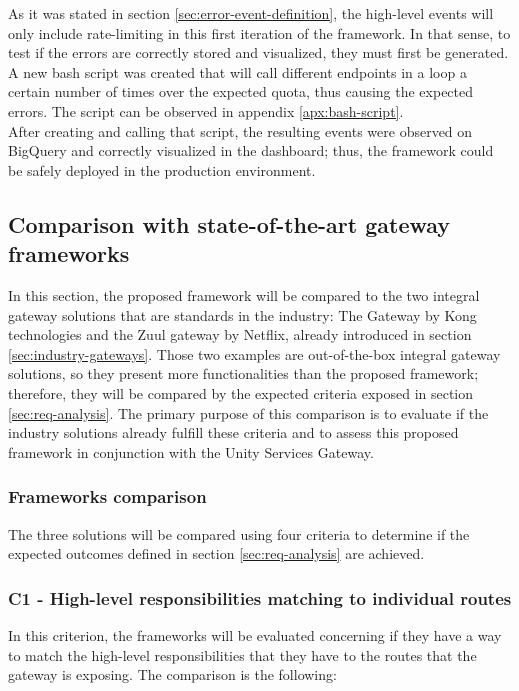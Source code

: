 \documentclass[english, 12pt, a4paper, sci, utf8, a-1b, online]{aaltothesis}
\begin{document}
As it was stated in section \ref{sec:error-event-definition}, the high-level events will only include rate-limiting in this first iteration of the framework. In that sense, to test if the errors are correctly stored and visualized, they must first be generated. A new bash script was created that will call different endpoints in a loop a certain number of times over the expected quota, thus causing the expected errors. The script can be observed in appendix \ref{apx:bash-script}.\\

After creating and calling that script, the resulting events were observed on BigQuery and correctly visualized in the dashboard; thus, the framework could be safely deployed in the production environment.

\subsection{Comparison with state-of-the-art gateway frameworks}
\label{sec:gateways-comparison}

In this section, the proposed framework will be compared to the two integral gateway solutions that are standards in the industry: The Gateway by Kong technologies and the Zuul gateway by Netflix, already introduced in section \ref{sec:industry-gateways}. Those two examples are out-of-the-box integral gateway solutions, so they present more functionalities than the proposed framework; therefore, they will be compared by the expected criteria exposed in section \ref{sec:req-analysis}. The primary purpose of this comparison is to evaluate if the industry solutions already fulfill these criteria and to assess this proposed framework in conjunction with the Unity Services Gateway.

\subsubsection{Frameworks comparison}

The three solutions will be compared using four criteria to determine if the expected outcomes defined in section \ref{sec:req-analysis} are achieved.

\subsubsection*{C1 - High-level responsibilities matching to individual routes}
In this criterion, the frameworks will be evaluated concerning if they have a way to match the high-level responsibilities that they have to the routes that the gateway is exposing. The comparison is the following:
\end{document}
